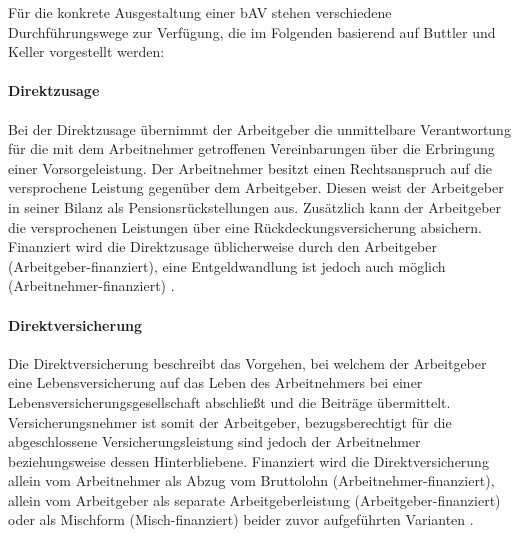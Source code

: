Für die konkrete Ausgestaltung einer bAV stehen verschiedene Durchführungswege zur Verfügung, die im Folgenden basierend auf Buttler und Keller \cite{buttler2017einfuehrung} vorgestellt werden:

\paragraph*{Direktzusage}
Bei der Direktzusage übernimmt der Arbeitgeber die unmittelbare Verantwortung für die mit dem Arbeitnehmer getroffenen Vereinbarungen über die Erbringung einer Vorsorgeleistung. Der Arbeitnehmer besitzt einen Rechtsanspruch auf die versprochene Leistung gegenüber dem Arbeitgeber. Diesen weist der Arbeitgeber in seiner Bilanz als Pensionsrückstellungen aus. Zusätzlich kann der Arbeitgeber die versprochenen Leistungen über eine Rückdeckungsversicherung absichern. Finanziert wird die Direktzusage üblicherweise durch den Arbeitgeber  (Arbeitgeber-finanziert), eine Entgeldwandlung ist jedoch auch möglich (Arbeitnehmer-finanziert) \cite[S. 140]{buttler2017einfuehrung}.

\paragraph*{Direktversicherung}

Die Direktversicherung beschreibt das Vorgehen, bei welchem der Arbeitgeber eine Lebensversicherung auf das Leben des Arbeitnehmers bei einer Lebensversicherungsgesellschaft abschließt und die Beiträge übermittelt. Versicherungsnehmer ist somit der Arbeitgeber, bezugsberechtigt für die abgeschlossene Versicherungsleistung sind jedoch der Arbeitnehmer beziehungsweise dessen Hinterbliebene. Finanziert wird die Direktversicherung allein vom Arbeitnehmer als Abzug vom Bruttolohn (Arbeitnehmer-finanziert), allein vom Arbeitgeber als separate Arbeitgeberleistung (Arbeitgeber-finanziert) oder als Mischform (Misch-finanziert) beider zuvor aufgeführten Varianten \cite[S. 33]{plato2016betriebliche}.

